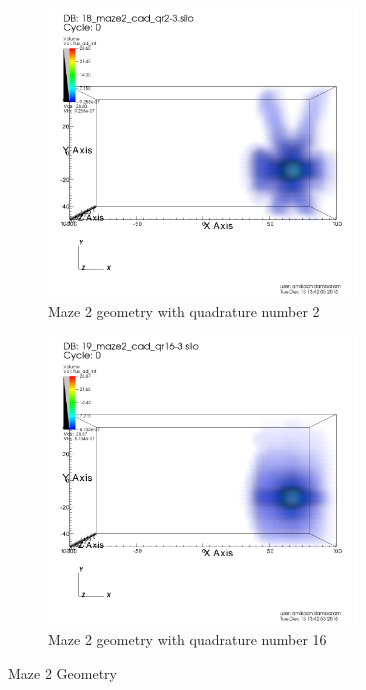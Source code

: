 \documentclass[10pt]{article}
\begin{document}
\begin{figure}[!ht]
\centering
\begin{subfigure}{0.49\textwidth}
\centering
\includegraphics[width = 0.9\textwidth]{visit/visit-maze2-02}
\caption{Maze 2 geometry with quadrature number 2}
\label{visit:maze2-02}
\end{subfigure}
\hfill
\begin{subfigure}{0.49\textwidth}
\centering
\includegraphics[width = 0.9\textwidth]{visit/visit-maze2-16}
\caption{Maze 2 geometry with quadrature number 16}
\label{visit:maze2-16}
\end{subfigure}
\caption{Maze 2 Geometry}
\label{visit:maze2}
\end{figure}
\end{document}
